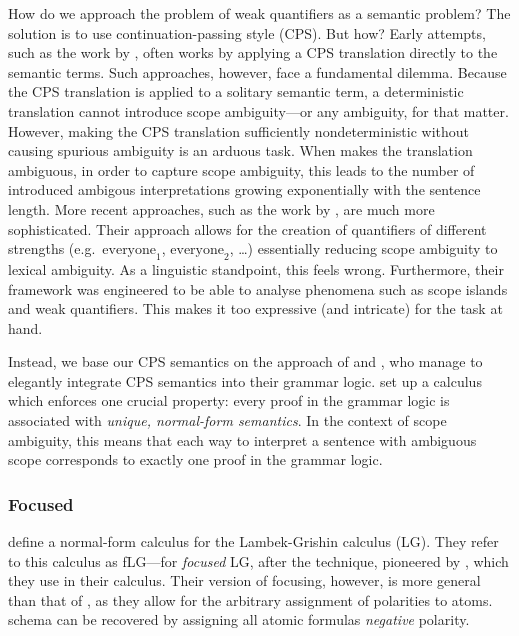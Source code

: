 \documentclass[10pt,a4paper]{llncs}
\begin{document}
How do we approach the problem of weak quantifiers as a semantic
problem? The solution is to use continuation-passing style (CPS).
But how? Early attempts, such as the work by \citep{barker2002},
often works by applying a CPS translation directly to the semantic
terms. Such approaches, however, face a fundamental dilemma.
Because the CPS translation is applied to a solitary semantic term,
a deterministic translation cannot introduce scope ambiguity---or any
ambiguity, for that matter.
However, making the CPS translation sufficiently nondeterministic
without causing spurious ambiguity is an arduous task. When
\citeauthor{barker2002} makes the translation ambiguous, in order to
capture scope ambiguity, this leads to the number of introduced
ambigous interpretations growing exponentially with the sentence
length.
More recent approaches, such as the work by \citet{kiselyov2014}, are
much more sophisticated. Their approach allows for the creation of
quantifiers of different strengths (e.g.\ $\text{everyone}_1$,
$\text{everyone}_2$, \dots) essentially reducing scope ambiguity
to lexical ambiguity. As a linguistic standpoint, this feels wrong.
Furthermore, their framework was engineered to be able to analyse
phenomena such as scope islands and weak quantifiers.
This makes it too expressive (and intricate) for the task at hand.

Instead, we base our CPS semantics on the approach of
\citet{moortgat2012} and \citet{bastenhof2013}, who manage to
elegantly integrate CPS semantics into their grammar logic.
\citeauthor{moortgat2012} set up a calculus which enforces
one crucial property: every proof in the grammar logic is associated
with \emph{unique, normal-form semantics}.
In the context of scope ambiguity, this means that each way to
interpret a sentence with ambiguous scope corresponds to exactly one
proof in the grammar logic.

\subsubsection{Focused {\NLCL}}%
\label{sec:normal-form}

\citet[][sec. 3.1]{moortgat2012} define a normal-form calculus for the
Lambek-Grishin calculus (LG).
They refer to this calculus as fLG---for \emph{focused} LG, after
the technique, pioneered by \citet{andreoli2001}, which
they use in their calculus.
Their version of focusing, however, is more general than that of
\citeauthor{andreoli2001}, as they allow for the arbitrary assignment
of polarities to atoms.  schema can be recovered
by assigning all atomic formulas \emph{negative} polarity.
\end{document}
